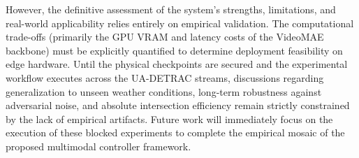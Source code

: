 \documentclass[conference]{IEEEtran}
\begin{document}
However, the definitive assessment of the system's strengths, limitations, and real-world applicability relies entirely on empirical validation. The computational trade-offs (primarily the GPU VRAM and latency costs of the VideoMAE backbone) must be explicitly quantified to determine deployment feasibility on edge hardware. Until the physical checkpoints are secured and the experimental workflow executes across the UA-DETRAC streams, discussions regarding generalization to unseen weather conditions, long-term robustness against adversarial noise, and absolute intersection efficiency remain strictly constrained by the lack of empirical artifacts. Future work will immediately focus on the execution of these blocked experiments to complete the empirical mosaic of the proposed multimodal controller framework.
\end{document}
